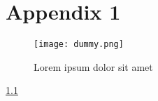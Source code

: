 \chapter{Appendix 1}
\label{appendix:appendix1}

\begin{figure}[H]
    \centering
    \texttt{[image: dummy.png]}
    \caption{Lorem ipsum dolor sit amet}
    \label{fig:figAppendix-1}
\end{figure}

\lipsum[1-1] \ref{fig:figAppendix-1}